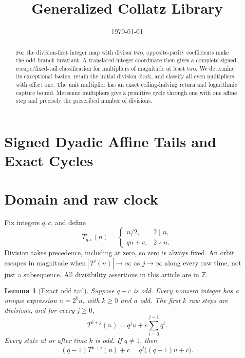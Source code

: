 \documentclass[11pt,letterpaper]{article}
\title{Generalized Collatz Library}
\author{}
\date{\today}
\newcommand{\Z}{\mathbb{Z}}
\newtheorem{lemma}[theorem]{Lemma}
\begin{document}
\maketitle
\section*{Signed Dyadic Affine Tails and Exact Cycles}

\begin{abstract}
For the division-first integer map with divisor two, opposite-parity
coefficients make the odd branch invariant. A translated integer coordinate
then gives a complete signed escape/fixed-tail classification for multipliers
of magnitude at least two. We determine its exceptional basins, retain the
initial division clock, and classify all even multipliers with offset one.
The unit multiplier has an exact ceiling-halving return and logarithmic
capture bound. Mersenne multipliers give a primitive cycle through one with
one affine step and precisely the prescribed number of divisions.
\end{abstract}

\section{Domain and raw clock}

Fix integers \(q,c\), and define
\[
T_{q,c}(n)=
\begin{cases}
n/2,&2\mid n,\\
qn+c,&2\nmid n.
\end{cases}
\]
Division takes precedence, including at zero, so zero is always fixed.
An orbit escapes in magnitude when \(|T^j(n)|\to\infty\) as \(j\to\infty\)
along every raw time, not just a subsequence. All divisibility assertions
in this article are in \(\Z\).

\begin{lemma}[Exact odd tail]
\label{lem:tail}
Suppose \(q+c\) is odd. Every nonzero integer has a unique expression
\(n=2^k u\), with \(k\ge0\) and \(u\) odd. The first \(k\) raw steps are
divisions, and for every \(j\ge0\),
\[
T^{k+j}(n)=q^j u+c\sum_{i=0}^{j-1}q^i.
\]
Every state at or after time \(k\) is odd. If \(q\ne1\), then
\begin{equation}
\label{eq:shift}
(q-1)T^{k+j}(n)+c=q^j\bigl((q-1)u+c\bigr).
\end{equation}
\end{lemma}
\end{document}
